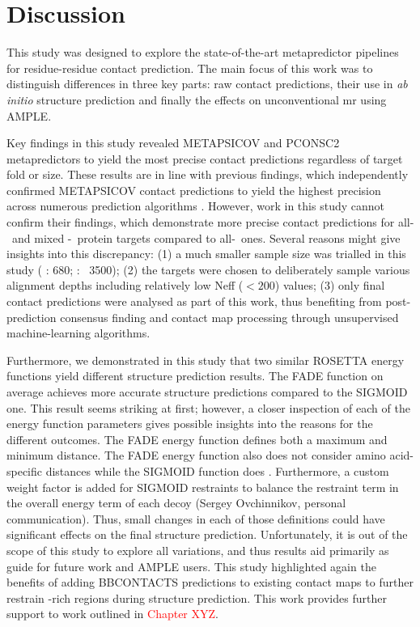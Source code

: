 \section{Discussion}
This study was designed to explore the state-of-the-art metapredictor pipelines for residue-residue contact prediction. The main focus of this work was to distinguish differences in three key parts: raw contact predictions, their use in  \textit{ab initio} structure prediction and finally the effects on unconventional \gls{mr} using AMPLE.

Key findings in this study revealed METAPSICOV and PCONSC2 metapredictors to yield the most precise contact predictions regardless of target fold or size. These results are in line with previous findings, which independently confirmed METAPSICOV contact predictions to yield the highest precision across numerous prediction algorithms \cite{Wuyun2016-hh, De_Oliveira2017-gj}. However, work in this study cannot confirm their findings, which demonstrate more precise contact predictions for all-\textbeta\ and mixed \textalpha-\textbeta\ protein targets compared to all-\textalpha\ ones. Several reasons might give insights into this discrepancy: (1) a much smaller sample size was trialled in this study ( \textcite{Wuyun2016-hh}: 680; \textcite{De_Oliveira2017-gj}: ~3500); (2) the targets were chosen to deliberately sample various alignment depths including relatively low Neff ($<200$) values; (3) only final contact predictions were analysed as part of this work, thus benefiting from post-prediction consensus finding and contact map processing through unsupervised machine-learning algorithms.

Furthermore, we demonstrated in this study that two similar ROSETTA energy functions yield different structure prediction results. The FADE function on average achieves more accurate structure predictions compared to the SIGMOID one. This result seems striking at first; however, a closer inspection of each of the energy function parameters gives possible insights into the reasons for the different outcomes. The FADE energy function defines both a maximum and minimum distance. The FADE energy function also does not consider amino acid-specific distances while the SIGMOID function does \cite{Kamisetty2013-le}. Furthermore, a custom weight factor is added for SIGMOID restraints to balance the restraint term in the overall energy term of each decoy (Sergey Ovchinnikov, personal communication). Thus, small changes in each of those definitions could have significant effects on the final structure prediction. Unfortunately, it is out of the scope of this study to explore all variations, and thus results aid primarily as guide for future work and AMPLE users. This study highlighted again the benefits of adding BBCONTACTS predictions to existing contact maps to further restrain \textbeta-rich regions during structure prediction. This work provides further support to work outlined in \textcolor{red}{Chapter XYZ}.

